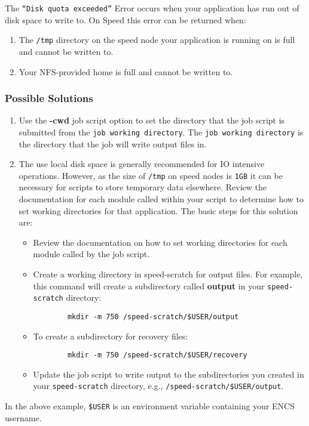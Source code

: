 \documentclass{easychair}
\begin{document}
The \texttt{``Disk quota exceeded''} Error occurs when your application has run out of disk space to write to. On Speed this error can be returned when:
\begin{enumerate}
	\item
The \texttt{/tmp} directory on the speed node your application is running on is full and cannot be written to.
	\item
Your NFS-provided home is full and cannot be written to.
\end{enumerate}

\subsubsection{Possible Solutions}

\begin{enumerate}
	\item
Use the \textbf{-cwd} job script option to set the directory that the job script
 is submitted from the \texttt{job working directory}. The \texttt{job working directory} is the directory that the job will write output files in.
	\item
The use local disk space is generally recommended for IO intensive operations. However, as the size of \texttt{/tmp} on speed nodes 
is \texttt{1GB} it can be necessary for scripts to store temporary data 
elsewhere. 
Review the documentation for each module called within your script to 
determine how to set working directories for that application. 
The basic steps for this solution are:
\begin{itemize}
	\item
	Review the documentation on how to set working directories for 
	each module called by the job script.
	\item
	Create a working directory in speed-scratch for output files. 
	For example, this command will create a subdirectory called \textbf{output}
	 in your \verb!speed-scratch! directory:
	 \begin{verbatim}
		mkdir -m 750 /speed-scratch/$USER/output
	 \end{verbatim}
	\item
	To create a subdirectory for recovery files:
	\begin{verbatim}
		mkdir -m 750 /speed-scratch/$USER/recovery
	\end{verbatim}
	\item
	Update the job script to write output to the subdirectories you created in your \verb!speed-scratch! directory, e.g., \verb!/speed-scratch/$USER/output!.
	\end{itemize}
\end{enumerate}
In the above example, \verb!$USER! is an environment variable containing your ENCS username.
\end{document}
